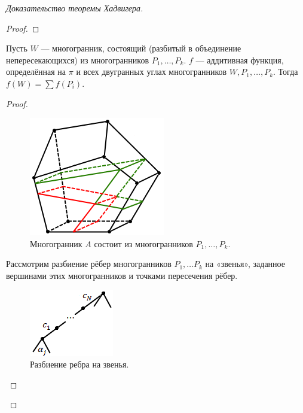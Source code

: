 \begin{proof}[Доказательство теоремы Хадвигера]
\begin{proof}
\end{proof}

\begin{lemma}[2]
    Пусть $W$ — многогранник, состоящий (разбитый в объединение непересекающихся) из многогранников $P_1, \dots, P_k$. $f$ — аддитивная функция, определённая на $\pi$ и всех двугранных углах многогранников $W,P_1, \dots, P_k$. Тогда $f(W) = \sum f(P_i)$.
\end{lemma}
\begin{proof}
    \begin{figure}[htbp]
        \centering
        \includegraphics[scale=0.7]{images/c8.4.png}
        \caption{Многогранник $A$ состоит из многогранников $P_1, \dots, P_k$.}
        \label{fig:c8.4}
    \end{figure}

    Рассмотрим разбиение рёбер многогранников $P_1, \dots P_k$ на «звенья», заданное вершинами этих многогранников и точками пересечения рёбер.

    \begin{figure}[htbp]
        \centering
        \includegraphics[scale=0.7]{images/c8.5.png}
        \caption{Разбиение ребра на звенья.}
        \label{fig:c8.5}
    \end{figure}


\end{proof}
\end{proof}
